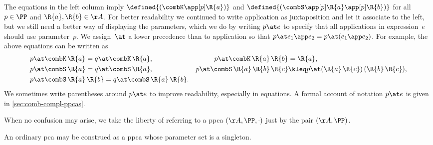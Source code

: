 The equations in the left column imply $\defined{(\combK \app[p] \R{a})}$ and $\defined{(\combS \app[p] \R{a} \app[p] \R{b})}$ for all $p \in \PP$ and $\R{a}, \R{b} \in \AA$.
%
For better readability we continued to write application as juxtaposition and let it associate to the left,
but we still need a better way of displaying the parameters, which we do by writing $p \at e$ to specify
that all applications in expression~$e$ should use parameter~$p$. We assign~$\at$ a lower precedence than to application so that $p \at e_1 \app e_2 = p \at (e_1 \app e_2)$. For example, the above equations can be written as
%
\begin{align*}
  &p \at \combK \, \R{a} = q \at \combK \, \R{a},
  &p \at \combK \, \R{a} \, \R{b} &= \R{a},
  \\
  &p \at \combS \, \R{a} = q \at \combS \, \R{a},
  &p \at \combS \, \R{a} \, \R{b} \, \R{c} &\kleq p \at (\R{a} \, \R{c}) \, (\R{b} \, \R{c}),
  \\
  &p \at \combS \, \R{a} \, \R{b} = q \at \combS \, \R{a} \, \R{b}.
\end{align*}
%
We sometimes write parentheses around $p \at e$ to improve readability, especially in equations.
A formal account of notation $p \at e$ is given in \cref{sec:comb-compl-ppcas}.


When no confusion may arise, we take the liberty of referring to a ppca $(\AA, \PP, {\cdot})$ just by the pair $(\AA, \PP)$.

\begin{example}
  An ordinary pca may be construed as a ppca whose parameter set is a singleton.
\end{example}

